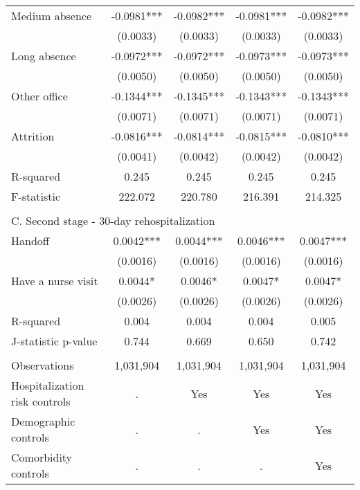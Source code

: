 \documentclass[final,12pt, notitlepage]{article}
\begin{document}
\begin{singlespace}
\begin{table}[H]
\begin{threeparttable}
{\begin{tabular*}{\textwidth}{l@{\extracolsep{\fill}}*{4}{c}}
Medium absence      &     -0.0981***&     -0.0982***&     -0.0981***&     -0.0982***\\
                    &    (0.0033)   &    (0.0033)   &    (0.0033)   &    (0.0033)   \\
Long absence        &     -0.0972***&     -0.0972***&     -0.0973***&     -0.0973***\\
                    &    (0.0050)   &    (0.0050)   &    (0.0050)   &    (0.0050)   \\
Other office        &     -0.1344***&     -0.1345***&     -0.1343***&     -0.1343***\\
                    &    (0.0071)   &    (0.0071)   &    (0.0071)   &    (0.0071)   \\
Attrition           &     -0.0816***&     -0.0814***&     -0.0815***&     -0.0810***\\
                    &    (0.0041)   &    (0.0042)   &    (0.0042)   &    (0.0042)   \\
R-squared           &      0.245   &      0.245   &      0.245   &      0.245   \\
F-statistic         &    222.072   &    220.780   &    216.391  &    214.325   \\
\\
\multicolumn{5}{l}{C. Second stage - 30-day rehospitalization} \\
Handoff             &      0.0042***&      0.0044***&      0.0046***&      0.0047***\\
                    &    (0.0016)   &    (0.0016)   &    (0.0016)   &    (0.0016)   \\
Have a nurse visit  &      0.0044*  &      0.0046*  &      0.0047*  &      0.0047*  \\
                    &    (0.0026)   &    (0.0026)   &    (0.0026)   &    (0.0026)   \\
R-squared           &      0.004   &      0.004   &      0.004   &      0.005   \\
J-statistic p-value &      0.744   &      0.669   &      0.650   &      0.742   \\
\\
\midrule
Observations        &     1,031,904         &     1,031,904         &     1,031,904         &     1,031,904         \\
Hospitalization risk controls & . & Yes & Yes & Yes \\
Demographic controls & . & . & Yes & Yes \\
 Comorbidity controls & . & . & . & Yes \\

\end{tabular*}}
\end{threeparttable}
\end{table}
\end{singlespace}
\end{document}
